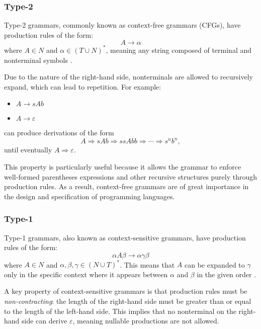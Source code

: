 \subsubsection{Type-2}

Type-2 grammars, commonly known as context-free grammars (CFGs), have production rules of the form:
\[
A \rightarrow \alpha
\]
where \( A \in N \) and \( \alpha \in (T \cup N)^* \), meaning any string composed of terminal and nonterminal symbols \cite{hendriksConsiderItParsed,shiIntelligenceScience2021}.

Due to the nature of the right-hand side, nonterminals are allowed to recursively expand, which can lead to repetition. For example:
\begin{itemize}
    \item[] \( A \rightarrow sAb \)
    \item[] \( A \rightarrow \varepsilon \)
\end{itemize}
can produce derivations of the form
\[
A \Rightarrow sAb \Rightarrow ssAbb \Rightarrow \cdots \Rightarrow s^n b^n,
\]
until eventually \( A \Rightarrow \varepsilon \).

This property is particularly useful because it allows the grammar to enforce well-formed parentheses expressions and other recursive structures purely through production rules. As a result, context-free grammars are of great importance in the design and specification of programming languages\cite{hendriksConsiderItParsed,shiIntelligenceScience2021}.

\subsubsection{Type-1}

Type-1 grammars, also known as context-sensitive grammars, have production rules of the form:
\[
\alpha A \beta \rightarrow \alpha \gamma \beta
\]
where \( A \in N \) and \( \alpha, \beta, \gamma \in (N \cup T)^* \). This means that \( A \) can be expanded to \( \gamma \) only in the specific context where it appears between \( \alpha \) and \( \beta \) in the given order \cite{hendriksConsiderItParsed,shiIntelligenceScience2021}.

\vspace{\baselineskip}
A key property of context-sensitive grammars is that production rules must be \emph{non-contracting}: the length of the right-hand side must be greater than or equal to the length of the left-hand side. This implies that no nonterminal on the right-hand side can derive \( \varepsilon \), meaning nullable productions are not allowed.

